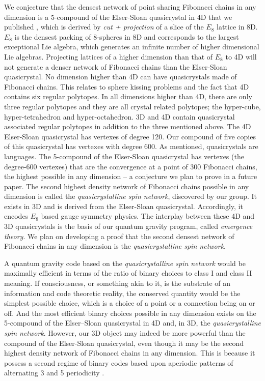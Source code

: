\documentclass[submission,copyright,creativecommons]{eptcs}
\begin{document}
We conjecture that the densest network of point sharing Fibonacci chains in any dimension is a 5-compound of the Elser-Sloan quasicrystal in 4D that we published \cite{fang2015icosahedral}, which is derived by \textit{cut + projection} of a slice of the $E_{8}$ lattice in 8D. $E_{8}$ is the densest packing of 8-spheres in 8D and corresponds to the largest exceptional Lie algebra, which generates an infinite number of higher dimensional Lie algebras. Projecting lattices of a higher dimension than that of $E_{8}$ to 4D will not generate a denser network of Fibonacci chains than the Elser-Sloan quasicrystal. No dimension higher than 4D can have quasicrystals made of Fibonacci chains. This relates to sphere kissing problems and the fact that 4D contains six regular polytopes. In all dimensions higher than 4D, there are only three regular polytopes and they are all crystal related polytopes; the hyper-cube, hyper-tetrahedron and hyper-octahedron. 3D and 4D contain quasicrystal associated regular polytopes in addition to the three mentioned above. The 4D Elser-Sloan quasicrystal has vertexes of degree 120. Our compound of five copies of this quasicrystal has vertexes with degree 600. As mentioned, quasicrystals are languages. The 5-compound of the Elser-Sloan quasicrystal has vertexes (the degree-600 vertexes) that are the convergence at a point of 300 Fibonacci chains, the highest possible in any dimension -- a conjecture we plan to prove in a future paper. The second highest density network of Fibonacci chains possible in any dimension is called the \textit{quasicrystalline spin network}, discovered by our group. It exists in 3D and is derived from the Elser-Sloan quasicrystal. Accordingly, it encodes $E_{8}$ based gauge symmetry physics. The interplay between these 4D and 3D quasicrystals is the basis of our quantum gravity program, called \textit{emergence theory}. We plan on developing a proof that the second densest network of Fibonacci chains in any dimension is the \textit{quasicrystalline spin network}.

A quantum gravity code based on the \textit{quasicrystalline spin network} would be maximally efficient in terms of the ratio of binary choices to class I and class II meaning. If consciousness, or something akin to it, is the substrate of an information and code theoretic reality, the conserved quantity would be the simplest possible choice, which is a choice of a point or a connection being on or off. And the most efficient binary choices possible in any dimension exists on the 5-compound of the Elser–Sloan quasicrystal in 4D and, in 3D, the \textit{quasicrystalline spin network}. However, our 3D object may indeed be more powerful than the compound of the Elser-Sloan quasicrystal, even though it may be the second highest density network of Fibonacci chains in any dimension. This is because it possess a second regime of binary codes based upon aperiodic patterns of alternating 3 and 5 periodicity \cite{sadler2013periodic}.  
\end{document}
